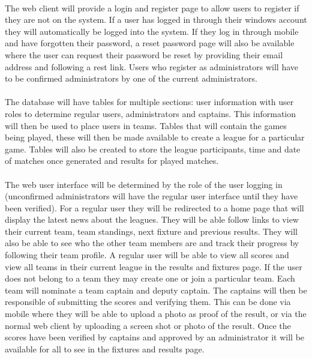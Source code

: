 \documentclass[11pt,a4paper]{article}
\begin{document}
\paragraph{}
The web client will provide a login and register page to allow users to register if they are not on the system. If a user has logged in through their windows account they will automatically be logged into the system. If they log in through mobile and have forgotten their password, a reset password page will also be available where the user can request their password be reset by providing their email address and following a rest link. Users who register as administrators will have to be confirmed administrators by one of the current administrators.

\paragraph{}
The database will have tables for multiple sections: user information with user roles to determine regular users, administrators and captains. This information will then be used to place users in teams. Tables that will contain the games being played, these will then be made available to create a league for a particular game. Tables will also be created to store the league participants, time and date of matches once generated and results for played matches.

\paragraph{}
The web user interface will be determined by the role of the user logging in (unconfirmed administrators will have the regular user interface until they have been verified). For a regular user they will be redirected to a home page that will display the latest news about the leagues. They will be able follow links to view their current team, team standings, next fixture and previous results. They will also be able to see who the other team members are and track their progress by following their team profile. A regular user will be able to view all scores and view all teams in their current league in the results and fixtures page. If the user does not belong to a team they may create one or join a particular team. Each team will nominate a team captain and deputy captain. The captains will then be responsible of submitting the scores and verifying them. This can be done via mobile where they will be able to upload a photo as proof of the result, or via the normal web client by uploading a screen shot or photo of the result. Once the scores have been verified by captains and approved by an administrator it will be available for all to see in the fixtures and results page.
\end{document}

